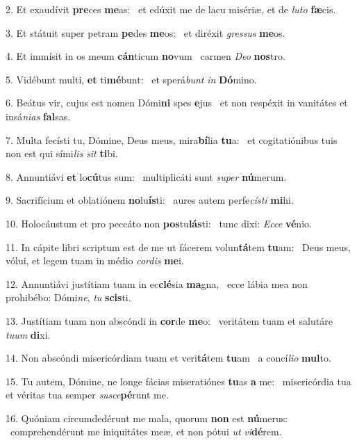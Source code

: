 2. Et exaudívit \textbf{pre}ces \textbf{me}as: \ast\  et edúxit me de lacu misériæ, et de \textit{lu}\textit{to} \textbf{fæ}cis.\

3. Et státuit super petram \textbf{pe}des \textbf{me}os: \ast\  et diréxit \textit{gres}\textit{sus} \textbf{me}os.\

4. Et immísit in os meum \textbf{cán}ticum \textbf{no}vum \ast\  carmen \textit{De}\textit{o} \textbf{nos}tro.\

5. Vidébunt multi, \textbf{et} ti\textbf{mé}bunt: \ast\  et sperá\textit{bunt} \textit{in} \textbf{Dó}mino.\

6. Beátus vir, cujus est nomen Dómi\textbf{ni} spes \textbf{e}jus \ast\  et non respéxit in vanitátes et insá\textit{ni}\textit{as} \textbf{fal}sas.\

7. Multa fecísti tu, Dómine, Deus meus, mira\textbf{bí}lia \textbf{tu}a: \ast\  et cogitatiónibus tuis non est qui sími\textit{lis} \textit{sit} \textbf{ti}bi.\

8. Annuntiávi \textbf{et} lo\textbf{cú}tus sum: \ast\  multiplicáti sunt \textit{su}\textit{per} \textbf{nú}merum.\

9. Sacrifícium et oblatiónem \textbf{no}lu\textbf{ís}ti: \ast\  aures autem perfe\textit{cís}\textit{ti} \textbf{mi}hi.\

10. Holocáustum et pro peccáto non \textbf{pos}tu\textbf{lás}ti: \ast\  tunc dixi: \textit{Ec}\textit{ce} \textbf{vé}nio.\

11. In cápite libri scriptum est de me ut fácerem volun\textbf{tá}tem \textbf{tu}am: \ast\  Deus meus, vólui, et legem tuam in médio \textit{cor}\textit{dis} \textbf{me}i.\

12. Annuntiávi justítiam tuam in ec\textbf{clé}sia \textbf{ma}gna, \ast\  ecce lábia mea non prohibébo: Dómi\textit{ne}, \textit{tu} \textbf{scis}ti.\

13. Justítiam tuam non abscóndi in \textbf{cor}de \textbf{me}o: \ast\  veritátem tuam et salutáre \textit{tu}\textit{um} \textbf{di}xi.\

14. Non abscóndi misericórdiam tuam et veri\textbf{tá}tem \textbf{tu}am \ast\  a concí\textit{li}\textit{o} \textbf{mul}to.\

15. Tu autem, Dómine, ne longe fácias miseratiónes \textbf{tu}as \textbf{a} me: \ast\  misericórdia tua et véritas tua semper \textit{su}\textit{sce}\textbf{pé}runt me.\

16. Quóniam circumdedérunt me mala, quorum \textbf{non} est \textbf{nú}merus: \ast\  comprehendérunt me iniquitátes meæ, et non pótui \textit{ut} \textit{vi}\textbf{dé}rem.\

